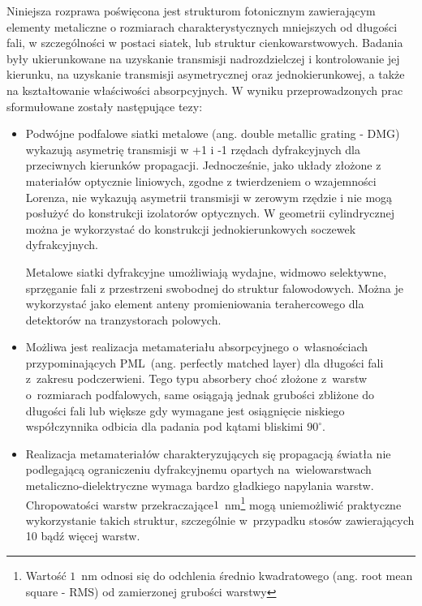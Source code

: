 Niniejsza rozprawa poświęcona jest strukturom fotonicznym zawierającym elementy metaliczne o rozmiarach charakterystycznych mniejszych od długości fali, w szczególności w postaci siatek, lub struktur cienkowarstwowych. Badania były ukierunkowane na uzyskanie  transmisji nadrozdzielczej i kontrolowanie jej kierunku, na uzyskanie transmisji asymetrycznej oraz jednokierunkowej, a także na kształtowanie właściwości absorpcyjnych. W wyniku przeprowadzonych prac sformułowane zostały następujące tezy:

\begin{itemize}
\item Podwójne podfalowe siatki metalowe (ang. double metallic grating - DMG) wykazują asymetrię transmisji w +1 i -1 rzędach dyfrakcyjnych dla przeciwnych kierunków propagacji. Jednocześnie, jako układy złożone z materiałów optycznie liniowych, zgodne z twierdzeniem o wzajemności Lorenza, nie wykazują asymetrii transmisji w zerowym rzędzie i nie mogą posłużyć do konstrukcji izolatorów optycznych. W geometrii cylindrycznej można je wykorzystać do konstrukcji jednokierunkowych soczewek dyfrakcyjnych.

\itemi Metalowe siatki dyfrakcyjne umożliwiają wydajne, widmowo selektywne, sprzęganie fali z przestrzeni swobodnej do struktur falowodowych. Można je wykorzystać jako element anteny promieniowania terahercowego dla detektorów na tranzystorach polowych.

\item Możliwa jest realizacja metamateriału absorpcyjnego o~własnościach przypominających PML~(ang. perfectly matched layer) dla długości fali z~zakresu podczerwieni. Tego typu absorbery choć złożone z~warstw o~rozmiarach podfalowych, same osiągają jednak grubości zbliżone do długości fali lub większe gdy wymagane jest osiągnięcie niskiego współczynnika odbicia dla padania pod kątami bliskimi $90^{\circ}$.

\item Realizacja metamateriałów charakteryzujących się propagacją światła nie podlegającą ograniczeniu dyfrakcyjnemu opartych na~wielowarstwach metaliczno-dielektryczne wymaga bardzo gładkiego napylania warstw. Chropowatości warstw przekraczające$1$~nm\footnote{Wartość $1$~nm odnosi się do odchlenia średnio kwadratowego (ang. root mean square - RMS) od zamierzonej grubości warstwy} mogą uniemożliwić praktyczne wykorzystanie takich struktur, szczególnie w~przypadku stosów zawierających 10 bądź więcej warstw.
\end{itemize}
